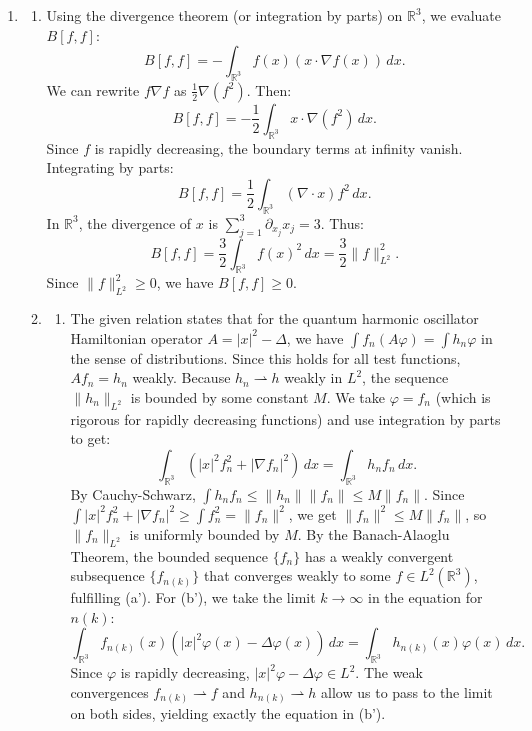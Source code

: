 \documentclass{article}
\begin{document}
\begin{enumerate}[label=\fbox{\arabic*}]
  \item %
        \begin{enumerate}[label=(\arabic*)]
          \item Using the divergence theorem (or integration by parts) on $\mathbb{R}^3$, we evaluate $B[f, f]$:
          \[
            B[f, f] = - \int_{\mathbb{R}^3} f(x) (x \cdot \nabla f(x)) \, dx.
          \]
          We can rewrite $f \nabla f$ as $\frac{1}{2} \nabla (f^2)$. Then:
          \[
            B[f, f] = - \frac{1}{2} \int_{\mathbb{R}^3} x \cdot \nabla (f^2) \, dx.
          \]
          Since $f$ is rapidly decreasing, the boundary terms at infinity vanish. Integrating by parts:
          \[
            B[f, f] = \frac{1}{2} \int_{\mathbb{R}^3} (\nabla \cdot x) f^2 \, dx.
          \]
          In $\mathbb{R}^3$, the divergence of $x$ is $\sum_{j=1}^3 \partial_{x_j} x_j = 3$. Thus:
          \[
            B[f, f] = \frac{3}{2} \int_{\mathbb{R}^3} f(x)^2 \, dx = \frac{3}{2} \|f\|_{L^2}^2.
          \]
          Since $\|f\|_{L^2}^2 \ge 0$, we have $B[f, f] \ge 0$.
          
          \item 
          \begin{enumerate}[label=(\roman*)]
            \item The given relation states that for the quantum harmonic oscillator Hamiltonian operator $A = |x|^2 - \Delta$, we have $\int f_n (A \varphi) = \int h_n \varphi$ in the sense of distributions. Since this holds for all test functions, $A f_n = h_n$ weakly.
            Because $h_n \rightharpoonup h$ weakly in $L^2$, the sequence $\|h_n\|_{L^2}$ is bounded by some constant $M$.
            We take $\varphi = f_n$ (which is rigorous for rapidly decreasing functions) and use integration by parts to get:
            \[
              \int_{\mathbb{R}^3} (|x|^2 f_n^2 + |\nabla f_n|^2) \, dx = \int_{\mathbb{R}^3} h_n f_n \, dx.
            \]
            By Cauchy-Schwarz, $\int h_n f_n \le \|h_n\| \|f_n\| \le M \|f_n\|$.
            Since $\int |x|^2 f_n^2 + |\nabla f_n|^2 \ge \int f_n^2 = \|f_n\|^2$, we get $\|f_n\|^2 \le M \|f_n\|$, so $\|f_n\|_{L^2}$ is uniformly bounded by $M$.
            By the Banach-Alaoglu Theorem, the bounded sequence $\{f_n\}$ has a weakly convergent subsequence $\{f_{n(k)}\}$ that converges weakly to some $f \in L^2(\mathbb{R}^3)$, fulfilling (a').
            For (b'), we take the limit $k \to \infty$ in the equation for $n(k)$:
            \[
              \int_{\mathbb{R}^3} f_{n(k)}(x) (|x|^2 \varphi(x) - \Delta \varphi(x)) \, dx = \int_{\mathbb{R}^3} h_{n(k)}(x) \varphi(x) \, dx.
            \]
            Since $\varphi$ is rapidly decreasing, $|x|^2 \varphi - \Delta \varphi \in L^2$. The weak convergences $f_{n(k)} \rightharpoonup f$ and $h_{n(k)} \rightharpoonup h$ allow us to pass to the limit on both sides, yielding exactly the equation in (b').
            

\end{enumerate}
\end{enumerate}
\end{enumerate}
\end{document}
